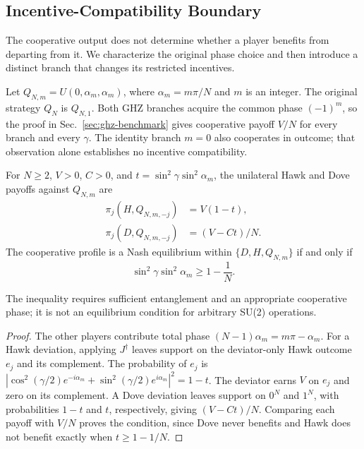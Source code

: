 \subsection{Incentive-Compatibility Boundary}
\label{sec:incentive-boundary}
The cooperative output does not determine whether a player benefits from
departing from it. We characterize the original phase choice and then
introduce a distinct branch that changes its restricted incentives.

Let $Q_{N,m}=U(0,\alpha_m,\alpha_m)$, where
$\alpha_m=m\pi/N$ and $m$ is an integer. The original strategy $Q_N$
is $Q_{N,1}$. Both GHZ branches acquire the common phase $(-1)^m$, so
the proof in Sec.~\ref{sec:ghz-benchmark} gives cooperative payoff $V/N$
for every branch and every $\gamma$. The identity branch $m=0$ also
cooperates in outcome; that observation alone establishes no incentive compatibility.

\begin{proposition}
For $N\ge2$, $V>0$, $C>0$, and $t=\sin^2\gamma\sin^2\alpha_m$, the
unilateral Hawk and Dove payoffs against $Q_{N,m}$ are
\begin{equation}
\begin{split}
\pi_j(H,Q_{N,m,-j})&=V(1-t),\\
\pi_j(D,Q_{N,m,-j})&=(V-Ct)/N.
\end{split}
\label{eq:phase-deviations}
\end{equation}
The cooperative profile is a Nash equilibrium within
$\{D,H,Q_{N,m}\}$ if and only if
\begin{equation}
\sin^2\gamma\sin^2\alpha_m\ge1-\frac1N.
\label{eq:phase-boundary}
\end{equation}
\end{proposition}
The inequality requires sufficient entanglement and an appropriate cooperative
phase; it is not an equilibrium condition for arbitrary SU(2) operations.

\begin{proof}
The other players contribute total phase
$(N-1)\alpha_m=m\pi-\alpha_m$. For a Hawk deviation, applying $J^\dagger$
leaves support on the deviator-only Hawk outcome $e_j$ and its complement.
The probability of $e_j$ is
$|\cos^2(\gamma/2)e^{-i\alpha_m}
+\sin^2(\gamma/2)e^{i\alpha_m}|^2=1-t$.
The deviator earns $V$ on $e_j$ and zero on its complement.
A Dove deviation leaves support on $0^N$ and $1^N$, with probabilities
$1-t$ and $t$, respectively, giving $(V-Ct)/N$. Comparing each payoff
with $V/N$ proves the condition, since Dove never benefits and Hawk
does not benefit exactly when $t\ge1-1/N$.
\end{proof}

